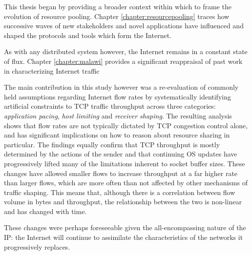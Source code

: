 This thesis began by providing a broader context within which to frame the evolution of resource pooling.
Chapter \ref{chapter:resourcepooling} traces how successive waves of new stakeholders and novel applications have influenced and shaped the protocols and tools which form the Internet.

As with any distributed system however, the Internet remains in a constant state of flux.
\LOREM
Chapter \ref{chapter:malawi} provides a significant reappraisal of past work in characterizing Internet traffic

The main contribution in this study however was a re-evaluation of commonly held assumptions regarding Internet flow rates by systematically identifying artificial constraints to \ac{TCP} traffic throughput across three categories: \emph{application pacing}, \emph{host limiting} and \emph{receiver shaping}. 
The resulting analysis shows that flow rates are not typically dictated by \ac{TCP} congestion control alone, and has significant implications on how to reason about resource sharing in particular.
The findings equally confirm that \ac{TCP} throughput is mostly determined by the actions of the sender and that continuing \acf{OS} updates have progressively lifted many of the limitations inherent to socket buffer sizes. 
These changes have allowed smaller flows to increase throughput at a far higher rate than larger flows, which are more often than not affected by other mechanisms of traffic shaping.
This means that, although there is a correlation between flow volume in bytes and throughput, the relationship between the two is non-linear and has changed with time.

These changes were perhaps foreseeable given the all-encompassing nature of the \ac{IP}: the Internet will continue to assimilate the characteristics of the networks it progressively replaces.







